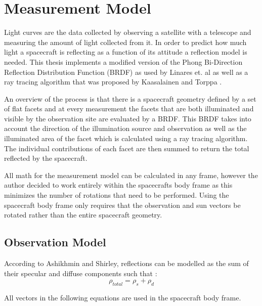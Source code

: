 \chapter{Measurement Model}


Light curves are the data collected by observing a satellite with a telescope and measuring the amount of light collected from it. In order to predict how much light a spacecraft is reflecting as a function of its attitude a reflection model is needed. This thesis implements a modified version of the Phong Bi-Direction Reflection Distribution Function (BRDF) as used by Linares et. al \cite{Linares_data_fusion} as well as a ray tracing algorithm that was proposed by Kaasalainen and Torppa \cite{Kaasalainen_LCI}.

An overview of the process is that there is a spacecraft geometry defined by a set of flat facets and at every measurement the facets that are both illuminated and visible by the observation site are evaluated by a BRDF. This BRDF takes into account the direction of the illumination source and observation as well as the illuminated area of the facet which is calculated using a ray tracing algorithm. The individual contributions of each facet are then summed to return the total reflected by the spacecraft.

All math for the measurement model can be calculated in any frame, however the author decided to work entirely within the spacecrafts body frame as this minimizes the number of rotations that need to be performed. Using the spacecraft body frame only requires that the observation and sun vectors be rotated rather than the entire spacecraft geometry.

\section{Observation Model}

According to Ashikhmin and Shirley, reflections can be modelled as the sum of their specular and diffuse components such that \cite{phong_brdf}:
\begin{equation}\label{PHONG1}
\rho_{total} = \rho_s + \rho_d
\end{equation}

All vectors in the following equations are used in the spacecraft body frame.

